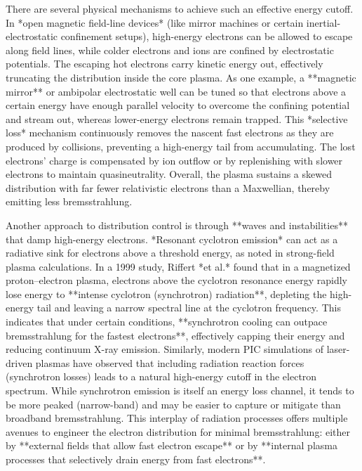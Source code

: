 \documentclass[12pt]{article}
\begin{document}
{There are several physical mechanisms to achieve such an effective energy cutoff. In *open magnetic field-line devices* (like mirror machines or certain inertial-electrostatic confinement setups), high-energy electrons can be allowed to escape along field lines, while colder electrons and ions are confined by electrostatic potentials. The escaping hot electrons carry kinetic energy out, effectively truncating the distribution inside the core plasma. As one example, a **magnetic mirror** or ambipolar electrostatic well can be tuned so that electrons above a certain energy have enough parallel velocity to overcome the confining potential and stream out, whereas lower-energy electrons remain trapped. This *selective loss* mechanism continuously removes the nascent fast electrons as they are produced by collisions, preventing a high-energy tail from accumulating. The lost electrons’ charge is compensated by ion outflow or by replenishing with slower electrons to maintain quasineutrality. Overall, the plasma sustains a skewed distribution with far fewer relativistic electrons than a Maxwellian, thereby emitting less bremsstrahlung.

Another approach to distribution control is through **waves and instabilities** that damp high-energy electrons. *Resonant cyclotron emission* can act as a radiative sink for electrons above a threshold energy, as noted in strong-field plasma calculations. In a 1999 study, Riffert *et al.* found that in a magnetized proton–electron plasma, electrons above the cyclotron resonance energy rapidly lose energy to **intense cyclotron (synchrotron) radiation**, depleting the high-energy tail and leaving a narrow spectral line at the cyclotron frequency. This indicates that under certain conditions, **synchrotron cooling can outpace bremsstrahlung for the fastest electrons**, effectively capping their energy and reducing continuum X-ray emission. Similarly, modern PIC simulations of laser-driven plasmas have observed that including radiation reaction forces (synchrotron losses) leads to a natural high-energy cutoff in the electron spectrum. While synchrotron emission is itself an energy loss channel, it tends to be more peaked (narrow-band) and may be easier to capture or mitigate than broadband bremsstrahlung. This interplay of radiation processes offers multiple avenues to engineer the electron distribution for minimal bremsstrahlung: either by **external fields that allow fast electron escape** or by **internal plasma processes that selectively drain energy from fast electrons**.

}
\end{document}
